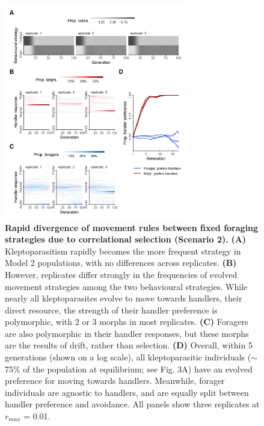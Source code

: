 \documentclass[11pt]{article}
\begin{document}
\begin{figure}[h!]
    \centering
    \includegraphics[width=0.70\textwidth]{figures/fig_03.png}
    \caption{
       \textbf{Rapid divergence of movement rules between fixed foraging strategies due to correlational selection (Scenario 2).}
       \textbf{(A)} Kleptoparasitism rapidly becomes the more frequent strategy in Model 2 populations, with no differences across replicates.
       \textbf{(B)} However, replicates differ strongly in the frequencies of evolved movement strategies among the two behavioural strategies.
       While nearly all kleptoparasites evolve to move towards handlers, their direct resource, the strength of their handler preference is polymorphic, with 2 or 3 morphs in most replicates.
       \textbf{(C)} Foragers are also polymorphic in their handler responses, but these morphs are the results of drift, rather than selection.
       \textbf{(D)} Overall, within 5 generations (shown on a log scale), all kleptoparasitic individuals ($\sim$75\% of the population at equilibrium; see Fig. 3A) have an evolved preference for moving towards handlers.
       Meanwhile, forager individuals are agnostic to handlers, and are equally split between handler preference and avoidance.
       All panels show three replicates at $r_{max}$ = 0.01.
    }
    \label{Fig:Syndrome}
\end{figure}
\end{document}
